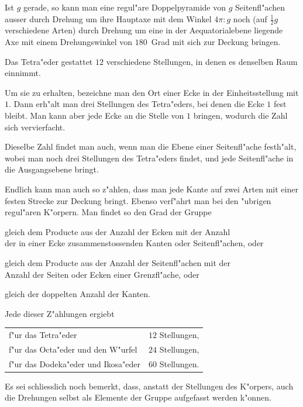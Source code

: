 \documentclass[12pt,a4paper]{article}
\theoremstyle{definition}
\begin{document}
Ist $g$ gerade, so kann man eine regul"are Doppelpyramide von $g$ Seitenfl"achen ausser durch Drehung um ihre Hauptaxe mit dem Winkel $4\pi:g$ noch (auf $\frac{1}{2}g$ verschiedene Arten) durch Drehung um eine in der Aequatorialebene liegende Axe mit einem Drehungswinkel von $180$~Grad mit sich zur Deckung bringen.

Das Tetra"eder gestattet $12$ verschiedene Stellungen, in denen es denselben Raum einnimmt.

Um sie zu erhalten, bezeichne man den Ort einer Ecke in der Einheitsstellung mit $1$. Dann erh"alt man drei Stellungen des Tetra"eders, bei denen die Ecke $1$ fest bleibt. Man kann aber jede Ecke an die Stelle von $1$ bringen, wodurch die Zahl sich vervierfacht.

Dieselbe Zahl findet man auch, wenn man die Ebene einer Seitenfl"ache festh"alt, wobei man noch drei Stellungen des Tetra"eders findet, und jede Seitenfl"ache in die Ausgangsebene bringt.

Endlich kann man auch so z"ahlen, dass man jede Kante auf zwei Arten mit einer festen Strecke zur Deckung bringt. Ebenso verf"ahrt man bei den "ubrigen regul"aren K"orpern. Man findet so den Grad der Gruppe

\begin{center}
gleich dem Producte aus der Anzahl der Ecken mit der Anzahl\\
der in einer Ecke zusammenstossenden Kanten oder Seitenfl"achen, oder
\end{center}
\begin{center}
gleich dem Producte aus der Anzahl der Seitenfl"achen mit der\\
Anzahl der Seiten oder Ecken einer Grenzfl"ache, oder
\end{center}
\begin{center}
gleich der doppelten Anzahl der Kanten.
\end{center}

Jede dieser Z"ahlungen ergiebt
\begin{center}
\begin{tabular}{l@{\ }l}
f"ur das Tetra"eder & $12$ Stellungen, \\
f"ur das Octa"eder und den W"urfel & $24$ Stellungen, \\
f"ur das Dodeka"eder und Ikosa"eder & $60$ Stellungen.
\end{tabular}
\end{center}

Es sei schliesslich noch bemerkt, dass, anstatt der Stellungen des K"orpers, auch die Drehungen selbst als Elemente der Gruppe aufgefasst werden k"onnen.
\end{document}
